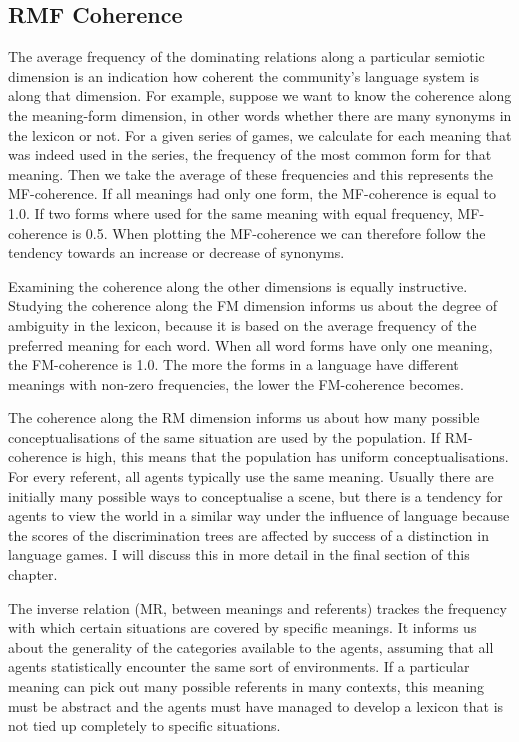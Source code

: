 \subsection{RMF Coherence}

The average frequency of the dominating relations along
a particular semiotic dimension is an indication how coherent the
community's language system is along that dimension.
For example, suppose we want to know the coherence along
the meaning-form dimension, in other words
whether there are many synonyms in the lexicon or not.
For a given series of games, we calculate for each meaning
that was indeed used in the series,
the frequency of the most common form
for that meaning. Then we take the average of these frequencies
and this represents the MF-coherence. If all meanings had
only one form, the MF-coherence is equal to 1.0. If two forms
where used for the same meaning with equal frequency, 
MF-coherence is 0.5. When plotting the
MF-coherence we can therefore follow the tendency towards
an increase or decrease of synonyms.

Examining the coherence along the other dimensions is 
equally instructive. Studying the coherence along the FM 
dimension informs us about the degree of ambiguity in the lexicon, 
because it is based on the average frequency of
the preferred meaning for each word. 
When all word forms have only one meaning, the FM-coherence is 
1.0. The more the forms in a language have different 
meanings with non-zero frequencies, the lower the FM-coherence
becomes. 

The coherence along the RM dimension informs us 
about how many possible conceptualisations of the same
situation are used by the population. If RM-coherence is 
high, this means that the population has 
uniform conceptualisations. For every referent, 
all agents typically use the same meaning. 
Usually there are initially many possible ways to conceptualise 
a scene, but there is a tendency 
for agents to view the world in a similar way under
the influence of language because the scores of the 
discrimination trees are affected by success of a 
distinction in language games. I will discuss this 
in more detail in the final section of this chapter.

The inverse relation (MR, between meanings and referents)
trackes the frequency with 
which certain situations are covered by specific
meanings. It informs us about 
the generality of the categories available to the 
agents, assuming that all agents statistically encounter
the same sort of environments. If a particular meaning can
pick out many possible referents in many contexts, this
meaning must be abstract and the agents must have managed
to develop a lexicon that is not tied up completely 
to specific situations. 

